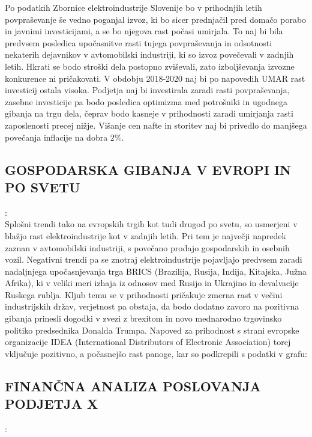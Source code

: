\documentclass[12pt,a4paper]{amsart}
\theoremstyle{definition} %
\theoremstyle{plain} %
\begin{document}
Po podatkih Zbornice elektroindustrije Slovenije bo v prihodnjih letih povpraševanje še vedno poganjal izvoz, ki bo sicer prednjačil pred domačo porabo in javnimi investicijami, a se bo njegova rast počasi umirjala. To naj bi bila predvsem posledica upočasnitve rasti tujega povpraševanja in odsotnosti nekaterih dejavnikov v avtomobilski industriji, ki so izvoz povečevali v zadnjih letih. Hkrati se bodo stroški dela postopno zviševali, zato izboljševanja izvozne konkurence ni pričakovati. V obdobju 2018-2020 naj bi po napovedih UMAR rast investicij ostala visoka. Podjetja naj bi investirala zaradi rasti povpraševanja, zasebne investicije pa bodo posledica optimizma med potrošniki in ugodnega gibanja na trgu dela, čeprav bodo kasneje v prihodnosti zaradi umirjanja rasti zaposlenosti precej nižje. Višanje cen nafte in storitev naj bi privedlo do manjšega povečanja inflacije na dobra $2\%$.

\subsection{GOSPODARSKA GIBANJA V EVROPI IN PO SVETU}:\\

Splošni trendi tako na evropskih trgih kot tudi drugod po svetu, so usmerjeni v blažjo rast elektroindustrije kot v zadnjih letih. Pri tem je največji napredek zaznan v avtomobilski industriji, s povečano prodajo gospodarskih in osebnih vozil. Negativni trendi pa se znotraj elektroindustrije pojavljajo predvsem zaradi nadaljnjega upočasnjevanja trga BRICS (Brazilija, Rusija, Indija, Kitajska, Južna Afrika), ki v veliki meri izhaja iz odnosov med Rusijo in Ukrajino in devalvacije Ruskega rublja. %
Kljub temu se v prihodnosti pričakuje zmerna rast v večini industrijskih držav, verjetnost pa obstaja, da bodo dodatno zavoro na pozitivna gibanja prinesli dogodki v zvezi z brexitom in novo mednarodno trgovinsko politiko predsednika Donalda Trumpa. Napoved za prihodnost s strani evropske organizacije IDEA (International Distributors of Electronic Association) torej vključuje pozitivno, a počasnejšo rast panoge, kar so podkrepili s podatki v grafu:



\subsection{FINANČNA ANALIZA POSLOVANJA PODJETJA X}:\\
\end{document}
